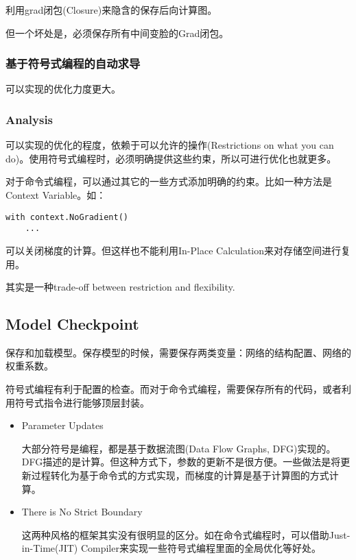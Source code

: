 利用grad闭包(Closure)来隐含的保存后向计算图。

但一个坏处是，必须保存所有中间变脸的Grad闭包。

\subsubsection{基于符号式编程的自动求导}

可以实现的优化力度更大。

\subsubsection{Analysis}

可以实现的优化的程度，依赖于可以允许的操作(Restrictions on what you can do)。使用符号式编程时，必须明确提供这些约束，所以可进行优化也就更多。

对于命令式编程，可以通过其它的一些方式添加明确的约束。比如一种方法是Context Variable。如：
\begin{verbatim}
with context.NoGradient()
    ...
\end{verbatim}
可以关闭梯度的计算。但这样也不能利用In-Place Calculation来对存储空间进行复用。

其实是一种trade-off between restriction and flexibility.

\subsection{Model Checkpoint}

保存和加载模型。保存模型的时候，需要保存两类变量：网络的结构配置、网络的权重系数。

符号式编程有利于配置的检查。而对于命令式编程，需要保存所有的代码，或者利用符号式指令进行能够顶层封装。

\begin{itemize}
\item Parameter Updates

大部分符号是编程，都是基于数据流图(Data Flow Graphs, DFG)实现的。DFG描述的是计算。但这种方式下，参数的更新不是很方便。一些做法是将更新过程转化为基于命令式的方式实现，而梯度的计算是基于计算图的方式计算。

\item There is No Strict Boundary

这两种风格的框架其实没有很明显的区分。如在命令式编程时，可以借助Just-in-Time(JIT) Compiler来实现一些符号式编程里面的全局优化等好处。
 
\end{itemize}


